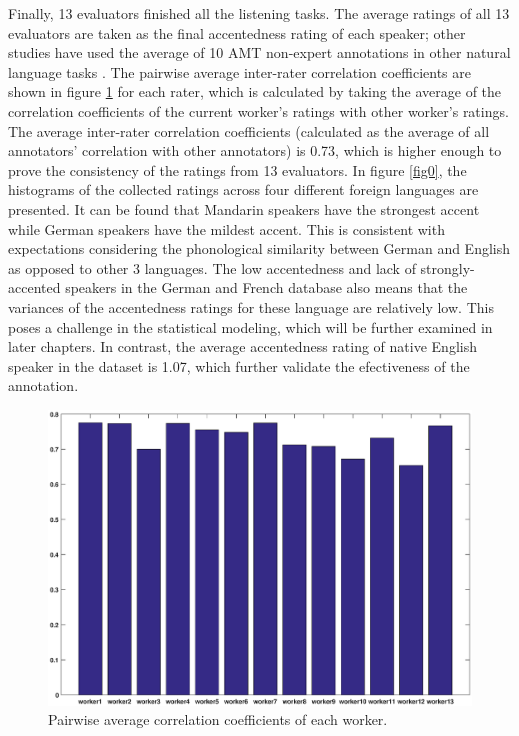 Finally, 13 evaluators finished all the listening tasks. The average ratings of all 13 evaluators are taken as the final accentedness rating of each speaker; other studies have used the average of 10 AMT non-expert annotations in other natural language tasks \citep{snow2008cheap}. The pairwise average inter-rater correlation coefficients are shown in figure \ref{fig:pairwise_corr} for each rater, which is calculated by taking the average of the correlation coefficients of the current worker's ratings with other worker's ratings. The average inter-rater correlation coefficients (calculated as the average of all annotators' correlation with other annotators) is 0.73, which is higher enough to prove the consistency of the ratings from 13 evaluators. In figure \ref{fig0}, the histograms of the collected ratings across four different foreign languages are presented. It can be found that Mandarin speakers have the strongest accent while German speakers have the mildest accent. This is consistent with expectations considering the phonological similarity between German and English as opposed to other 3 languages. The low accentedness and lack of strongly-accented speakers in the German and French database also means that the variances of the accentedness ratings for these language are relatively low. This poses a challenge in the statistical modeling, which will be further examined in later chapters. In contrast, the average accentedness rating of native English speaker in the dataset is 1.07, which further validate the efectiveness of the annotation.

\begin{figure}[t]
\centering
\captionsetup{justification=centering}
\includegraphics[width = 0.8\linewidth]{figures/mean_pairwise_correlation_without_work4.eps}
\caption{Pairwise average correlation coefficients of each worker.}
\label{fig:pairwise_corr}
\end{figure}

